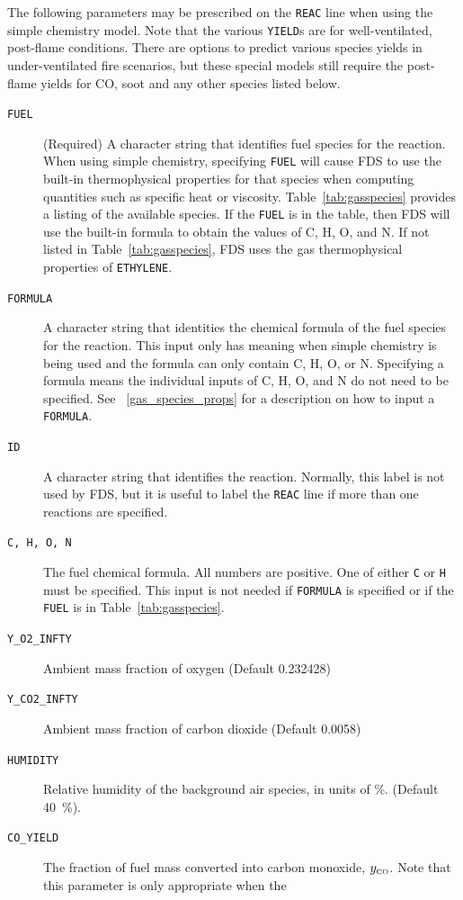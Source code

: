 \documentclass[11pt]{book}
\newcommand{\ct}{\tt\small}
\newcommand{\CO}{{\tiny \hbox{CO}}}
\begin{document}
\noindent The following parameters may be prescribed on the {\ct REAC} line when using the simple chemistry model.
Note that the various {\ct YIELD}s are for well-ventilated, post-flame conditions. There are options to
predict various species yields in under-ventilated fire scenarios, but these special models still require
the post-flame yields for CO, soot and any other species listed below.
\begin{description}
\item[{\ct FUEL}] (Required) A character string that identifies fuel species for the reaction. When using simple chemistry, specifying {\ct FUEL} will
cause FDS to use the built-in thermophysical properties for that species when computing quantities such as specific heat or viscosity.
Table~\ref{tab:gasspecies} provides a listing of the available species.
If the {\ct FUEL} is in the table, then FDS will use the built-in formula to obtain the values of C, H, O, and N.
If not listed in Table~\ref{tab:gasspecies}, FDS uses the gas thermophysical properties of {\ct ETHYLENE}.
\item[{\ct FORMULA}] A character string that identities the chemical formula of the fuel species for the reaction.
This input only has meaning when simple chemistry is being used and the formula can only contain C, H, O, or N.
Specifying a formula means the individual inputs of C, H, O, and N do not need to be specified. See ~\ref{gas_species_props} for a description on how to input a {\ct FORMULA}.
\item[{\ct ID}] A character string that identifies the reaction. Normally, this label is not used by FDS, but it is useful to
label the {\ct REAC} line if more than one reactions are specified.
\item[{\ct C, H, O, N}] The fuel chemical formula. All numbers are positive.  One of either {\ct C} or {\ct H} must be specified.
This input is not needed if {\ct FORMULA} is specified or if the {\ct FUEL} is in Table~\ref{tab:gasspecies}.
\item[{\ct Y\_O2\_INFTY}] Ambient mass fraction of oxygen (Default 0.232428)
\item[{\ct Y\_CO2\_INFTY}] Ambient mass fraction of carbon dioxide (Default 0.0058)
\item[{\ct HUMIDITY}] Relative humidity of the background air species, in units of \%. (Default 40~\%).
\item[{\ct CO\_YIELD}] The fraction of fuel mass converted into carbon monoxide, $y_{\CO}$. Note that this parameter is only appropriate when the

\end{description}
\end{document}
